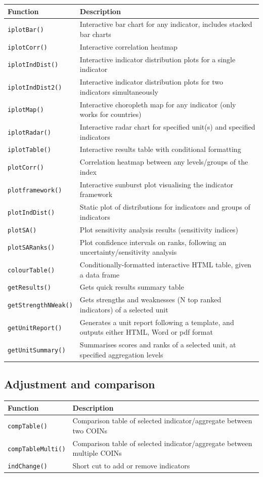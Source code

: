 \documentclass[
]{book}
\begin{document}
\begin{longtable}[]{@{}ll@{}}
\toprule
Function & Description\tabularnewline
\midrule
\endhead
\texttt{iplotBar()} & Interactive bar chart for any indicator, includes stacked bar charts\tabularnewline
\texttt{iplotCorr()} & Interactive correlation heatmap\tabularnewline
\texttt{iplotIndDist()} & Interactive indicator distribution plots for a single indicator\tabularnewline
\texttt{iplotIndDist2()} & Interactive indicator distribution plots for two indicators simultaneously\tabularnewline
\texttt{iplotMap()} & Interactive choropleth map for any indicator (only works for countries)\tabularnewline
\texttt{iplotRadar()} & Interactive radar chart for specified unit(s) and specified indicators\tabularnewline
\texttt{iplotTable()} & Interactive results table with conditional formatting\tabularnewline
\texttt{plotCorr()} & Correlation heatmap between any levels/groups of the index\tabularnewline
\texttt{plotframework()} & Interactive sunburst plot visualising the indicator framework\tabularnewline
\texttt{plotIndDist()} & Static plot of distributions for indicators and groups of indicators\tabularnewline
\texttt{plotSA()} & Plot sensitivity analysis results (sensitivity indices)\tabularnewline
\texttt{plotSARanks()} & Plot confidence intervals on ranks, following an uncertainty/sensitivity analysis\tabularnewline
\texttt{colourTable()} & Conditionally-formatted interactive HTML table, given a data frame\tabularnewline
\texttt{getResults()} & Gets quick results summary table\tabularnewline
\texttt{getStrengthNWeak()} & Gets strengths and weaknesses (N top ranked indicators) of a selected unit\tabularnewline
\texttt{getUnitReport()} & Generates a unit report following a template, and outputs either HTML, Word or pdf format\tabularnewline
\texttt{getUnitSummary()} & Summarises scores and ranks of a selected unit, at specified aggregation levels\tabularnewline
\bottomrule
\end{longtable}

\hypertarget{adjustment-and-comparison}{%
\subsection{Adjustment and comparison}\label{adjustment-and-comparison}}

\begin{longtable}[]{@{}ll@{}}
\toprule
Function & Description\tabularnewline
\midrule
\endhead
\texttt{compTable()} & Comparison table of selected indicator/aggregate between two COINs\tabularnewline
\texttt{compTableMulti()} & Comparison table of selected indicator/aggregate between multiple COINs\tabularnewline
\texttt{indChange()} & Short cut to add or remove indicators\tabularnewline
\bottomrule
\end{longtable}
\end{document}
